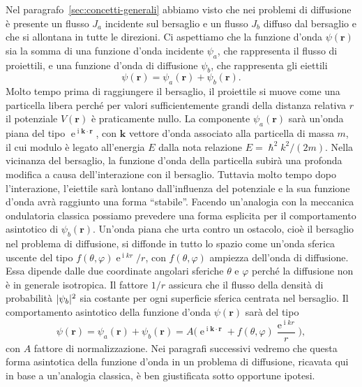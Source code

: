 \documentclass[a4paper,fleqn,twoside,12pt]{article}
\renewcommand{\phi}{\varphi}
\DeclareMathOperator{\e}{\mathrm{e}} %
\DeclareMathOperator{\uimm}{\mathrm{i}} %
\DeclarePairedDelimiter{\abs}{\lvert}{\rvert}
\begin{document}
Nel paragrafo~\ref{sec:concetti-generali} abbiamo visto che nei problemi di
diffusione è presente un flusso $J_{a}$ incidente sul bersaglio e un flusso
$J_{b}$ diffuso dal bersaglio e che si allontana in tutte le direzioni.  Ci
aspettiamo che la funzione d'onda $\psi(\bm{r})$ sia la somma di una funzione
d'onda incidente $\psi_{a}$, che rappresenta il flusso di proiettili, e una
funzione d'onda di diffusione $\psi_{b}$, che rappresenta gli eiettili
\begin{equation}
  \psi(\bm{r}) = \psi_{a}(\bm{r}) + \psi_{b}(\bm{r}).
\end{equation}
Molto tempo prima di raggiungere il bersaglio, il proiettile si muove come una
particella libera perché per valori sufficientemente grandi della distanza
relativa $r$ il potenziale $V(\bm{r})$ è praticamente nullo.  La componente
$\psi_{a}(\bm{r})$ sarà un'onda piana del tipo $\e^{\uimm \bm{k}\cdot\bm{r}}$,
con $\bm{k}$ vettore d'onda associato alla particella di massa $m$, il cui
modulo è legato all'energia $E$ dalla nota relazione $E =
\hslash^{2}k^{2}/(2m)$.
Nella vicinanza del bersaglio, la funzione d'onda della particella subirà una
profonda modifica a causa dell'interazione con il bersaglio.  Tuttavia molto
tempo dopo l'interazione, l'eiettile sarà lontano dall'influenza del potenziale
e la sua funzione d'onda avrà raggiunto una forma ``stabile''.  Facendo
un'analogia con la meccanica ondulatoria classica possiamo prevedere una forma
esplicita per il comportamento asintotico di $\psi_{b}(\bm{r})$.  Un'onda piana
che urta contro un ostacolo, cioè il bersaglio nel problema di diffusione, si
diffonde in tutto lo spazio come un'onda sferica uscente del tipo
$f(\theta,\phi)\e^{\uimm kr}/r$, con $f(\theta,\phi)$ ampiezza dell'onda di
diffusione.  Essa dipende dalle due coordinate angolari sferiche $\theta$ e
$\phi$ perché la diffusione non è in generale isotropica.  Il fattore $1/r$
assicura che il flusso della densità di probabilità $\abs{\psi_{b}}^{2}$ sia
costante per ogni superficie sferica centrata nel bersaglio.  Il comportamento
asintotico della funzione d'onda $\psi(\bm{r})$ sarà del tipo
\begin{equation}
  \label{eq:forma-asintotica}
  \psi(\bm{r}) = \psi_{a}(\bm{r}) + \psi_{b}(\bm{r}) =A \bigg( \e^{\uimm
    \bm{k}\cdot\bm{r}} + f(\theta,\phi)\frac{\e^{\uimm kr}}{r} \bigg),
\end{equation}
con $A$ fattore di normalizzazione.  Nei paragrafi successivi vedremo che questa
forma asintotica della funzione d'onda in un problema di diffusione, ricavata
qui in base a un'analogia classica, è ben giustificata sotto opportune ipotesi.
\end{document}
